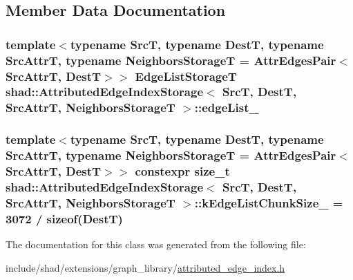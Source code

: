 \subsection{Member Data Documentation}
\hypertarget{classshad_1_1AttributedEdgeIndexStorage_a9b75c33790c1e4fc755dba28371fbe7b}{
\subsubsection[{edge\-List\-\_\-}]{\setlength{\rightskip}{0pt plus 5cm}template$<$typename Src\-T, typename Dest\-T, typename Src\-Attr\-T, typename Neighbors\-Storage\-T = Attr\-Edges\-Pair$<$\-Src\-Attr\-T, Dest\-T$>$$>$ {\bf Edge\-List\-Storage\-T} {\bf shad\-::\-Attributed\-Edge\-Index\-Storage}$<$ Src\-T, Dest\-T, Src\-Attr\-T, Neighbors\-Storage\-T $>$\-::edge\-List\-\_\-}}\label{classshad_1_1AttributedEdgeIndexStorage_a9b75c33790c1e4fc755dba28371fbe7b}
\hypertarget{classshad_1_1AttributedEdgeIndexStorage_a25f1c4ea3b8065bccaa587576d29e262}{
\subsubsection[{k\-Edge\-List\-Chunk\-Size\-\_\-}]{\setlength{\rightskip}{0pt plus 5cm}template$<$typename Src\-T, typename Dest\-T, typename Src\-Attr\-T, typename Neighbors\-Storage\-T = Attr\-Edges\-Pair$<$\-Src\-Attr\-T, Dest\-T$>$$>$ constexpr size\-\_\-t {\bf shad\-::\-Attributed\-Edge\-Index\-Storage}$<$ Src\-T, Dest\-T, Src\-Attr\-T, Neighbors\-Storage\-T $>$\-::k\-Edge\-List\-Chunk\-Size\-\_\- = 3072 / sizeof(Dest\-T)\hspace{0.3cm}{\ttfamily [static]}}}\label{classshad_1_1AttributedEdgeIndexStorage_a25f1c4ea3b8065bccaa587576d29e262}


The documentation for this class was generated from the following file\-:\begin{DoxyCompactItemize}
\item 
include/shad/extensions/graph\-\_\-library/\hyperlink{attributed__edge__index_8h}{attributed\-\_\-edge\-\_\-index.\-h}\end{DoxyCompactItemize}
